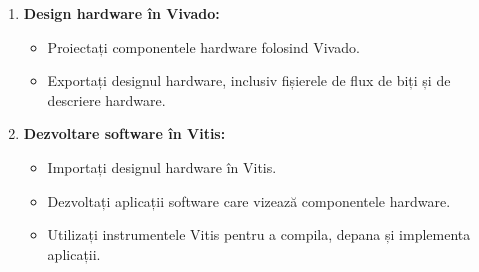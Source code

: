 \documentclass[12pt]{article}
\begin{document}
\begin{enumerate}
    \item \textbf{Design hardware în Vivado:}
    \begin{itemize}
        \item Proiectați componentele hardware folosind Vivado.
        \item Exportați designul hardware, inclusiv fișierele de flux de biți și de descriere hardware.
    \end{itemize}
        \item \textbf{Dezvoltare software în Vitis:}
    \begin{itemize}
        \item Importați designul hardware în Vitis.
        \item Dezvoltați aplicații software care vizează componentele hardware.
        \item Utilizați instrumentele Vitis pentru a compila, depana și implementa aplicații.
    \end{itemize}
\end{enumerate}
\end{document}
